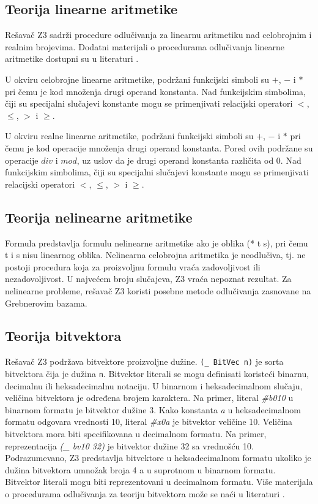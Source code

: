 \documentclass[12pt,oneside]{memoir}
\begin{document}
\subsection{Teorija linearne aritmetike} 

Rešavač Z3 sadrži procedure odlučivanja za linearnu aritmetiku nad celobrojnim i realnim brojevima. Dodatni materijali o procedurama odlučivanja linearne aritmetike dostupni su u literaturi \cite{FastLinearArithmetic}.
\par

U okviru celobrojne linearne aritmetike, podržani funkcijski simboli su $+$, $-$ i $*$ pri čemu je kod množenja drugi operand konstanta. Nad funkcijskim simbolima, čiji su specijalni slučajevi konstante mogu se primenjivati relacijski operatori $<$, $\leq$, $>$ i $\geq$. 
\par
U okviru realne linearne aritmetike, podržani funkcijski simboli su $+$, $-$ i $*$ pri čemu je kod operacije množenja drugi operand konstanta. Pored ovih podržane su operacije $div$ i $mod$, uz uslov da je drugi operand konstanta različita od 0. Nad funkcijskim simbolima, čiji su specijalni slučajevi konstante mogu se primenjivati relacijski operatori $<$, $\leq$, $>$ i $\geq$. 
\par
\subsection{Teorija nelinearne aritmetike} 

Formula predstavlja formulu nelinearne aritmetike ako je oblika (* t s), pri čemu t i s nisu linearnog oblika.
Nelinearna celobrojna aritmetika je neodlučiva, tj. ne postoji procedura koja za proizvoljnu formulu vraća zadovoljivost ili nezadovoljivost. U najvećem broju slučajeva, Z3 vraća nepoznat rezultat. Za nelinearne probleme, rešavač Z3 koristi posebne metode odlučivanja zasnovane na Grebnerovim bazama. 


\subsection{Teorija bitvektora} 
Rešavač Z3 podržava bitvektore proizvoljne dužine. \texttt{(\_ BitVec n)} je sorta bitvektora čija je dužina \texttt{n}. Bitvektor literali se mogu definisati koristeći binarnu, decimalnu ili heksadecimalnu notaciju. U binarnom i heksadecimalnom slučaju, veličina bitvektora je određena brojem karaktera. Na primer, literal \textit{\#b010} u binarnom formatu je bitvektor dužine 3. Kako konstanta \textit{a} u heksadecimalnom formatu odgovara vrednosti 10, literal \textit{\#x0a} je bitvektor veličine 10. Veličina bitvektora mora biti specifikovana u decimalnom formatu. Na primer, reprezentacija \textit{(\_ bv10 32)} je bitvektor dužine 32 sa vrednošću 10. Podrazumevano, Z3 predstavlja bitvektore u heksadecimalnom formatu ukoliko je dužina bitvektora umnožak broja 4 a u suprotnom u binarnom formatu. Bitvektor literali mogu biti reprezentovani u decimalnom formatu. Više materijala o procedurama odlučivanja za teoriju bitvektora može se naći u literaturi \cite{DPBitvector}.
\end{document}
